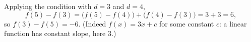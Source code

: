 Applying the condition with $d=3$ and $d=4$,
\[
f(5)-f(3)=\bigl(f(5)-f(4)\bigr)+\bigl(f(4)-f(3)\bigr)=3+3=6,
\]
so $f(3)-f(5)=\boxed{-6}$. (Indeed $f(x)=3x+c$ for some constant $c$: a linear function has constant slope, here $3$.)
